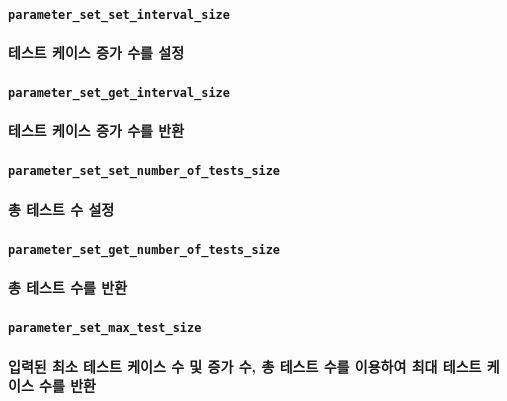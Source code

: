 \documentclass[UTF8, a4paper]{report}
\begin{document}
            \paragraph{\texttt{parameter\_set\_set\_interval\_size}}
            \paragraph{%
                \normalfont 테스트 케이스 증가 수를 설정
            }

            \paragraph{\texttt{parameter\_set\_get\_interval\_size}}
            \paragraph{%
                \normalfont 테스트 케이스 증가 수를 반환
            }

            \paragraph{\texttt{parameter\_set\_set\_number\_of\_tests\_size}}
            \paragraph{%
                \normalfont 총 테스트 수 설정
            }

            \paragraph{\texttt{parameter\_set\_get\_number\_of\_tests\_size}}
            \paragraph{%
                \normalfont 총 테스트 수를 반환
            }

            \paragraph{\texttt{parameter\_set\_max\_test\_size}}
            \paragraph{%
                \normalfont 입력된 최소 테스트 케이스 수 및 증가 수, 총 테스트 수를 이용하여 최대 테스트 케이스 수를 반환
            }
\end{document}
